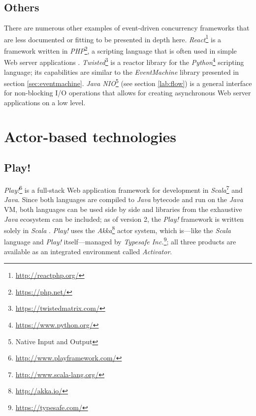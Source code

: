 \subsection{Others}
\label{lab:other-event}
There are numerous other examples of event-driven concurrency frameworks that are less documented or fitting to be presented in depth here. \textit{React}\footnote{\url{http://reactphp.org/}} is a framework written in \textit{PHP}\footnote{\url{https://php.net/}}, a scripting language that is often used in simple Web server applications \cite[p. 36]{Erb2012}. \textit{Twisted}\footnote{\url{https://twistedmatrix.com/}} is a reactor library for the \textit{Python}\footnote{\url{https://www.python.org/}} scripting language; its capabilities are similar to the \textit{EventMachine} library presented in section \ref{sec:eventmachine}. \textit{Java NIO}\footnote{Native Input and Output} (see section \ref{lab:flow}) is a general interface for non-blocking I/O operations that allows for creating asynchronous Web server applications on a low level.

\section{Actor-based technologies}

\subsection{Play!}
\label{lab:play}
\textit{Play!}\footnote{\url{http://www.playframework.com/}} is a full-stack Web application framework for development in \textit{Scala}\footnote{\url{http://www.scala-lang.org/}} and \textit{Java}. Since both languages are compiled to \textit{Java} bytecode and run on the \textit{Java} VM, both languages can be used side by side and libraries from the exhaustive \textit{Java} ecosystem can be included; as of version 2, the \textit{Play!} framework is written solely in \textit{Scala} \cite{Scala}. \textit{Play!} uses the \textit{Akka}\footnote{\url{http://akka.io/}} actor system, which is---like the \textit{Scala} language and \textit{Play!} itself---managed by \textit{Typesafe Inc.}\footnote{\url{https://typesafe.com/}}; all three products are available as an integrated environment called \textit{Activator}.

